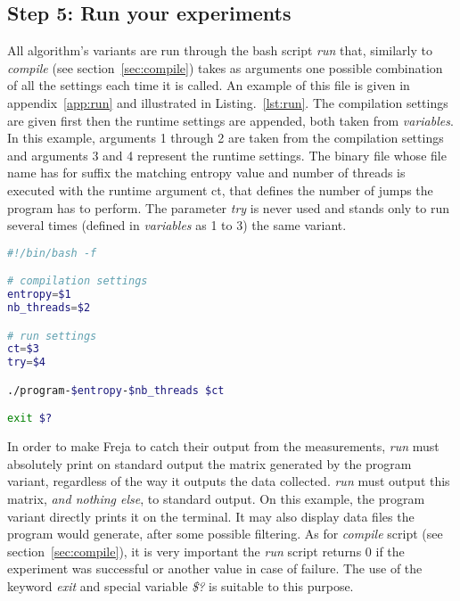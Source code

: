\subsection{Step 5: Run your experiments}
\label{sec:run}
All algorithm's variants are run through the bash script \emph{run} that, similarly to \emph{compile} (see section~\ref{sec:compile}) takes as arguments one possible combination of all the settings each time it is called. An example of this file is given in appendix~\ref{app:run} and illustrated in Listing.~\ref{lst:run}. The compilation settings are given first then the runtime settings are appended, both taken from \emph{variables}. In this example, arguments 1 through 2 are taken from the compilation settings and arguments 3 and 4 represent the runtime settings. The binary file whose file name has for suffix the matching entropy value and number of threads is executed with the runtime argument ct, that defines the number of jumps the program has to perform. The parameter \emph{try} is never used and stands only to run several times (defined in \emph{variables} as 1 to 3) the same variant.

\begin{lstlisting}[caption={\emph{run} catches the compilation settings first, then the run settings and run the right binary with relevant parameters.},label={lst:run},language=bash]
#!/bin/bash -f

# compilation settings
entropy=$1
nb_threads=$2

# run settings
ct=$3
try=$4

./program-$entropy-$nb_threads $ct

exit $?
\end{lstlisting}

In order to make Freja to catch their output from the measurements, \emph{run} must absolutely print on standard output the matrix generated by the program variant, regardless of the way it outputs the data collected. \emph{run} must output this matrix, \emph{and nothing else}, to standard output. On this example, the program variant directly prints it on the terminal. It may also display data files the program would generate, after some possible filtering. As for \emph{compile} script (see section~\ref{sec:compile}), it is very important the \emph{run} script returns 0 if the experiment was successful or another value in case of failure. The use of the keyword \emph{exit} and special variable \emph{\$?} is suitable to this purpose.

